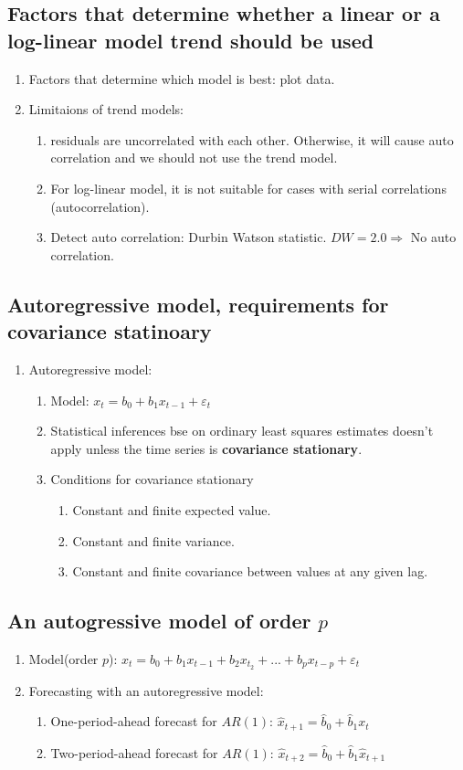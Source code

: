 \documentclass{article}
\newcommand{\be}{\begin{enumerate}}
\newcommand{\ee}{\end{enumerate}}
\begin{document}
\subsection{Factors that determine whether a linear or a log-linear model trend 
should be used}
\be
    \item Factors that determine which model is best: plot data.
    \item Limitaions of trend models: 
        \be
            \item residuals are uncorrelated with each other.
        Otherwise, it will cause auto correlation and we should not use the trend model.
            \item For log-linear model, it is not suitable for cases with serial correlations (autocorrelation).
            \item Detect auto correlation: Durbin Watson statistic. $DW=2.0\Rightarrow$ No auto correlation.
        \ee
\ee
\subsection{Autoregressive model, requirements for covariance statinoary}
\be
    \item Autoregressive model:
        \be
            \item Model: $x_t=b_0+b_1 x_{t-1}+\varepsilon_t$
            \item Statistical inferences bse on ordinary least squares estimates doesn't
                apply unless the time series is {\bf covariance stationary}.
            \item Conditions for covariance stationary
                \be
                    \item Constant and finite expected value.
                    \item Constant and finite variance.
                    \item Constant and finite covariance between values at any given lag.
                \ee
        \ee
\ee
\subsection{An autogressive model of order $p$}
\be
    \item Model(order $p$): $x_t=b_0+b_1x_{t-1}+b_2x_{t_2}+...+b_px_{t-p}+\varepsilon_t$ 
    \item Forecasting with an autoregressive model: 
        \be
            \item One-period-ahead forecast for $AR(1)$: $\hat{x}_{t+1}=\hat{b}_0+\hat{b}_1 x_t$
            \item Two-period-ahead forecast for $AR(1)$: $\hat{x}_{t+2}=\hat{b}_0+\hat{b}_1 \hat{x}_{t+1}$
        \ee
\ee
\end{document}
